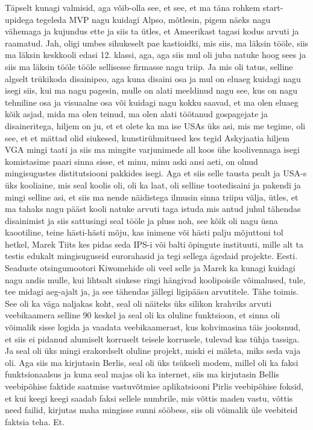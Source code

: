 Täpselt kunagi valmisid, aga võib-olla see, et see, et ma täna rohkem start-upidega tegeleda MVP nagu kuidagi Alpso, mõtlesin, pigem näeks nagu vähemaga ja kujundus ette ja siis ta ütles, et Ameerikast tagasi kodus arvuti ja raamatud. Jah, oligi umbes sihukeselt pae kastioidki, mis siis, ma läksin tööle, siis ma läksin keskkooli edasi 12. klassi, aga, aga siis mul oli juba natuke hoog sees ja siis ma läksin tööle tööle sellisesse firmasse nagu triip. Ja mis oli tatus, selline algselt trükikoda disainipeo, aga kuna disaini osa ja mul on eluaeg kuidagi nagu isegi siis, kui ma nagu pagesin, mulle on alati meeldinud nagu see, kus on nagu tehniline osa ja visuaalne osa või kuidagi nagu kokku saavad, et ma olen eluaeg kõik asjad, mida ma olen teinud, ma olen alati töötanud gospagejate ja disaineritega, hiljem on ju, et et olete ka ma ise USAs üks asi, mis me tegime, oli see, et et mättad olid siukesed, kunstirühmitused kes tegid Askyjaatia hiljem VGA mingi taati ja siis ma mingite varjunimede all koos ühe koolivennaga isegi komistasime paari sinna sisse, et minu, minu aski ansi aeti, on olnud mingisugustes distitutsiooni pakkides isegi. Aga et siis selle tausta pealt ja USA-s üks kooliaine, mis seal koolis oli, oli ka laat, oli selline tootedisaini ja pakendi ja mingi selline asi, et siis ma nende näidistega ilmusin sinna triipu välja, ütles, et ma tahaks nagu pääst kooli natuke arvuti taga istuda mis antud juhul tähendas disainimist ja siis sattusingi seal tööle ja pluss noh, see kõik oli nagu üsna kaootiline, teine hästi-hästi mõju, kas inimene või hästi palju mõjuttoni tol hetkel, Marek Tiits kes pidas seda IPS-i või balti õpingute instituuti, mille alt ta testis edukalt mingisuguseid eurorahasid ja tegi sellega ägedaid projekte. Eesti.
Seaduste otsingumootori Kiwomehide oli veel selle ja Marek ka kunagi kuidagi nagu andis mulle, kui lihtsalt siukese ringi hängivad koolipoisile võimalused, tule, tee midagi aeg-ajalt ja, ja see tähendas jällegi ligipääsu arvutitele. Tähe toimis. See oli ka väga naljakas koht, seal oli näiteks üks silikon krahviks arvuti veebikaamera selline 90 keskel ja seal oli ka oluline funktsioon, et sinna oli võimalik sisse logida ja vaadata veebikaamerast, kus kohvimasina täis jooksnud, et siis ei pidanud alumiselt korruselt teisele korrusele, tulevad kas tühja tassiga. Ja seal oli üks mingi erakordselt oluline projekt, miski ei mäleta, miks seda vaja oli. Aga siis ma kirjutasin Berlis, seal oli üks tsükseli modem, millel oli ka faksi funktsionaalsus ja kuna seal majas oli ka internet, siis ma kirjutasin Bellis veebipõhise faktide saatmise vastuvõtmise aplikatsiooni Pirlis veebipõhise foksid, et kui keegi keegi saadab faksi sellele numbrile, mis võttis maden vastu, võttis need failid, kirjutas maha mingisse sunni sööbess, siis oli võimalik üle veebiteid faktsia teha. Et.
